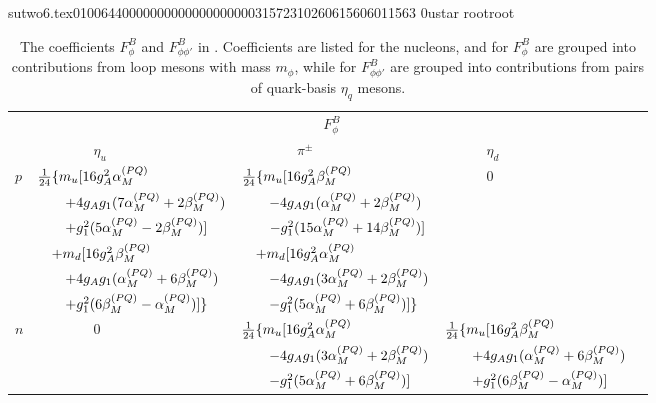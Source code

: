                                                                                                                                                                                                                                                                                       sutwo6.tex                                                                                          0100644 0000000 0000000 00000315723 10260615606 011563  0                                                                                                    ustar   root                            root                                                                                                                                                                                                                   \documentclass[prd,amssymb,amsmath,showpacs,nofootinbib,superscriptaddress]{revtex4}
\begin{document}
\begingroup
\squeezetable
\begin{table}[ht]
\caption{The coefficients $F^B_\phi$ and $F^B_{\phi\phi'}$ in \PQCPT. Coefficients are
listed for the nucleons, and for $F^B_\phi$ are grouped into contributions from loop mesons
with mass $m_\phi$, while for $F^B_{\phi\phi'}$ are grouped into contributions from pairs of quark-basis 
$\eta_q$ mesons.}
\begin{tabular}{l | l l l l  }
& \multicolumn{4}{c}{$F^B_\phi \phantom{ap}$} \\
      & $\qquad \qquad \eta_u $ & $\qquad \qquad \pi^\pm $ & $\qquad \quad \eta_d $ & \\  
\hline
\hline

$p$       
&  $\frac{1}{24} \{ m_u [16 g_A^2 {\alpha}_M^{(PQ)} $ 
&  $\frac{1}{24} \{ m_u [16 g_A^2 {\beta}_M^{(PQ)} $
&  $\quad\qquad 0 $ &\\

& $\quad\quad +4g_A g_1 (7{\alpha}_M^{(PQ)} +2{\beta}_M^{(PQ)}) $
& $\quad\quad -4g_A g_1 ({\alpha}_M^{(PQ)} +2{\beta}_M^{(PQ)})$
& & \\

& $\quad\quad +g_1^2 (5{\alpha}_M^{(PQ)} -2{\beta}_M^{(PQ)})]$
& $\quad\quad -g_1^2 (15{\alpha}_M^{(PQ)} +14{\beta}_M^{(PQ)})] $
&
& \\

& $\quad + m_d [16 g_A^2 {\beta}_M^{(PQ)}$
& $\quad + m_d [16 g_A^2 {\alpha}_M^{(PQ)} $
& & \\

& $\quad\quad +4 g_A g_1 ({\alpha}_M^{(PQ)} +6{\beta}_M^{(PQ)})$
& $\quad\quad -4g_A g_1 (3{\alpha}_M^{(PQ)} +2{\beta}_M^{(PQ)})$
& & \\

& $\quad\quad +g_1^2 (6{\beta}_M^{(PQ)} -{\alpha}_M^{(PQ)})] \}$
& $\quad\quad -g_1^2  (5{\alpha}_M^{(PQ)} +6{\beta}_M^{(PQ)})] \}$
&
& \\
\hline


$n$

&  $\qquad\qquad 0 $
&  $\frac{1}{24} \{ m_u [16 g_A^2 {\alpha}_M^{(PQ)}$  
&  $\frac{1}{24} \{ m_u [16 g_A^2 {\beta}_M^{(PQ)}$
& \\

&
& $\quad\quad - 4g_A g_1 (3{\alpha}_M^{(PQ)} +2{\beta}_M^{(PQ)})$
& $\quad\quad +4g_A g_1 ({\alpha}_M^{(PQ)} +6{\beta}_M^{(PQ)})$
& \\

&
& $\quad\quad -g_1^2 (5{\alpha}_M^{(PQ)} +6{\beta}_M^{(PQ)})] $
& $\quad\quad +g_1^2 (6{\beta}_M^{(PQ)}-{\alpha}_M^{(PQ)})]$
& \\


\end{tabular}
\end{table}
\end{document}
